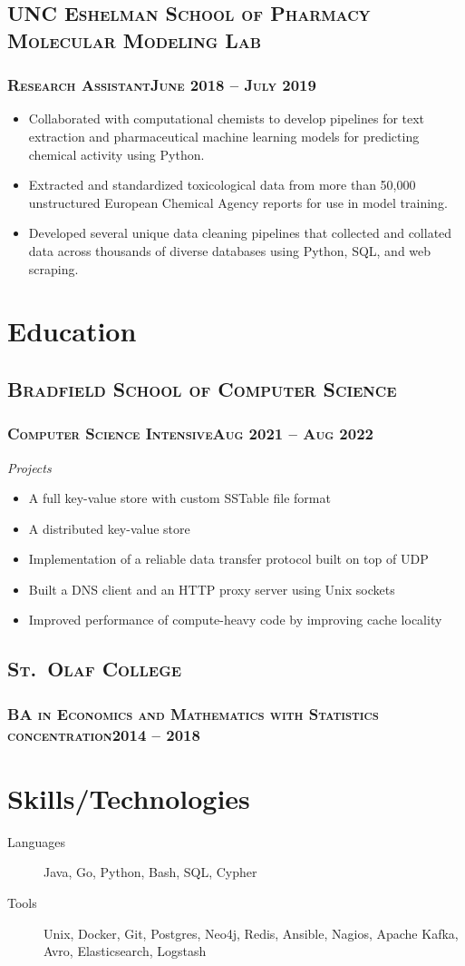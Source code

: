 \documentclass{article}
\newcommand{\resumeSection}[1]{\section*{#1}}
\newcommand{\institution}[1]{\subsection*{\scshape{#1}}}
\newcommand{\jobPosition}[3]{\subsubsection*{\scshape{#1}\hfill #2 -- #3}}
\begin{document}
  \institution{UNC Eshelman School of Pharmacy Molecular Modeling Lab}

    \jobPosition{Research Assistant}{June 2018}{July 2019}
    \begin{itemize}[noitemsep]
      \item
            Collaborated with computational chemists to develop
            pipelines for text extraction and pharmaceutical machine
            learning models for predicting chemical activity using Python.
      \item
            Extracted and standardized toxicological data from more
            than 50,000 unstructured European Chemical Agency reports
            for use in model training.
      \item
            Developed several unique data cleaning pipelines that
            collected and collated data across thousands of diverse
            databases using Python, SQL, and web scraping.
    \end{itemize}

\resumeSection{Education}
  \institution{Bradfield School of Computer Science}
    \jobPosition{Computer Science Intensive}{Aug 2021}{Aug 2022}

    \emph{Projects}
    \begin{itemize}[noitemsep]
      \item A full key-value store with custom SSTable file format
      \item A distributed key-value store
      \item Implementation of a reliable data transfer protocol built on top of UDP
      \item Built a DNS client and an HTTP proxy server using Unix sockets
      \item Improved performance of compute-heavy code by improving cache locality
    \end{itemize}

  \institution{St.\ Olaf College}
    \jobPosition{BA in Economics and Mathematics with Statistics concentration}{2014}{2018}

\resumeSection{Skills/Technologies}
  \begin{description}
          \item [Languages]
    Java,
    Go,
    Python,
    Bash,
    SQL,
    Cypher
          \item [Tools]
    Unix,
    Docker,
    Git,
    Postgres,
    Neo4j,
    Redis,
    Ansible,
    Nagios,
    Apache Kafka,
    Avro,
    Elasticsearch,
    Logstash
  \end{description}
\end{document}
